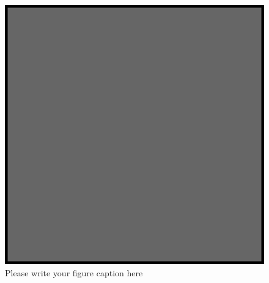 % 

\iffalse %

\begin{figure}
\includegraphics{example.eps}
\caption{Please write your figure caption here}
\label{fig:1}       %
\end{figure}
%
